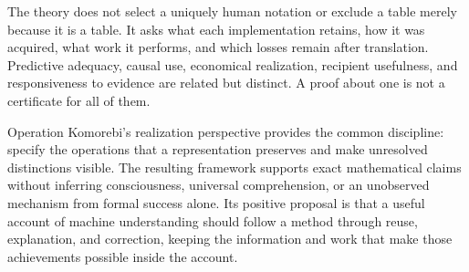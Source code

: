 The theory does not select a uniquely human notation or exclude a table merely because it is a table. It asks what each implementation retains, how it was acquired, what work it performs, and which losses remain after translation. Predictive adequacy, causal use, economical realization, recipient usefulness, and responsiveness to evidence are related but distinct. A proof about one is not a certificate for all of them.

Operation Komorebi's realization perspective provides the common discipline: specify the operations that a representation preserves and make unresolved distinctions visible. The resulting framework supports exact mathematical claims without inferring consciousness, universal comprehension, or an unobserved mechanism from formal success alone. Its positive proposal is that a useful account of machine understanding should follow a method through reuse, explanation, and correction, keeping the information and work that make those achievements possible inside the account.


